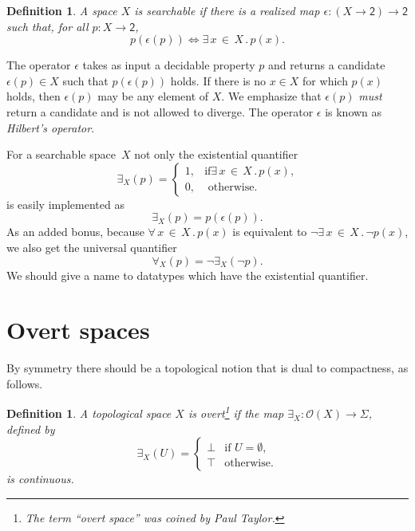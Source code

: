 \documentclass[a4paper,10pt]{article}
\newtheorem{definition}[theorem]{Definition}
\newcommand{\tpl}[1]{\mathcal{O}(#1)}
\newcommand{\two}{\mathsf{2}}
\newcommand{\xall}[3]{\forall\, #1 \,{\in}\, #2\,.\,#3}
\newcommand{\xsome}[3]{\exists\, #1 \,{\in}\, #2\,.\,#3}
\begin{document}
\begin{definition} A space $X$ is \emph{searchable} if there is a realized map
$\epsilon : (X \to \two) \to \two$ such that, for all $p : X \to \two$,
  \begin{equation*} p (\epsilon(p)) \iff \xsome{x}{X}{p(x)}.
  \end{equation*}
\end{definition}

The operator $\epsilon$ takes as input a decidable property $p$ and returns a
candidate $\epsilon(p) \in X$ such that $p(\epsilon(p))$ holds. If there is no
$x \in X$ for which $p(x)$ holds, then $\epsilon(p)$ may be any element of
$X$. We emphasize that $\epsilon(p)$ \emph{must} return a candidate and is not
allowed to diverge. The operator $\epsilon$ is known as \emph{Hilbert's
operator}.

For a searchable space~$X$ not only the existential quantifier
% 
\begin{equation*} \exists_X(p) = \begin{cases} 1, &\text{if
$\xsome{x}{X}{p(x)}$,}\\ 0, &\text{ otherwise.}
  \end{cases}
\end{equation*}
% 
is easily implemented as
\begin{equation*} \exists_X(p) = p (\epsilon(p)).
\end{equation*}
% 
As an added bonus, because $\xall{x}{X}{p(x)}$ is equivalent to
$\lnot\xsome{x}{X}{\lnot p(x)}$, we also get the universal quantifier
% 
\begin{equation*} \forall_X(p) = \lnot \exists_X(\lnot p).
\end{equation*}
% 
We should give a name to datatypes which have the existential quantifier.

\section{Overt spaces}
\label{sec:overt-spaces}

By symmetry there should be a topological notion that is dual to compactness,
as follows.

\begin{definition} A topological space $X$ is \emph{overt}\footnote{The term
``overt space'' was coined by Paul Taylor.} if the map $\exists_X : \tpl{X}
\to \Sigma$, defined by
  \begin{equation*} \exists_X (U) =
    \begin{cases} \bot & \text{if $U = \emptyset$,}\\ \top & \text{otherwise.}
    \end{cases}
  \end{equation*}
  is continuous.
\end{definition}
\end{document}
